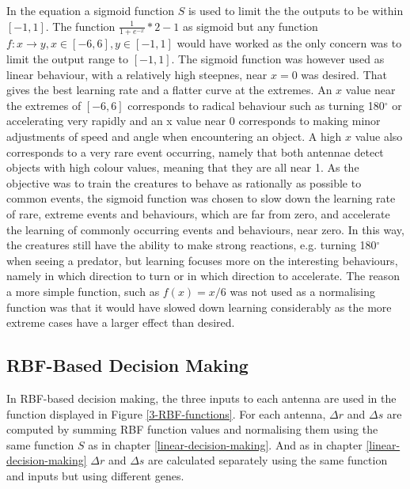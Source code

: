 \documentclass[a4paper,11pt]{kth-mag}
\begin{document}
In the equation a sigmoid function $S$ is used to limit the the outputs to be within $[-1,1]$. The function $\frac{1}{1+e^{-x}} * 2 -1$ as sigmoid but any function $f:x\rightarrow y, x\in [-6,6], y \in [-1,1]$ would have worked as the only concern was to limit the output range to $[-1,1]$. The sigmoid function was however used as linear behaviour, with a relatively high steepnes, near $x=0$ was desired. That gives the best learning rate and a flatter curve at the extremes. An $x$ value near the extremes of $[-6,6]$ corresponds to radical behaviour such as turning 180$^\circ$ or accelerating very rapidly and an x value near 0 corresponds to making minor adjustments of speed and angle when encountering an object. A high $x$ value also corresponds to a very rare event occurring, namely that both antennae detect objects with high colour values, meaning that they are all near 1. As the objective was to train the creatures to behave as rationally as possible to common events, the sigmoid function was chosen to slow down the learning rate of rare, extreme events and behaviours, which are far from zero, and accelerate the learning of commonly occurring events and behaviours, near zero.
In this way, the creatures still have the ability to make strong reactions, e.g. turning 180$^\circ$ when seeing a predator, but learning focuses more on the interesting behaviours, namely in which direction to turn or in which direction to accelerate. The reason a more simple function, such as $f(x) = x/6$ was not used as a normalising function was that it would have slowed down learning considerably as the more extreme cases have a larger effect than desired.

\subsection{RBF-Based Decision Making}

In RBF-based decision making, the three inputs to each antenna are used in the function displayed in Figure \ref{3-RBF-functions}. For each antenna, $\Delta r$  and $\Delta s$ are computed by summing RBF function values and normalising them using the same function $S$ as in chapter \ref{linear-decision-making}. And as in chapter \ref{linear-decision-making} $\Delta r$ and $\Delta s$ are calculated separately using the same function and inputs but using different genes.
\end{document}
